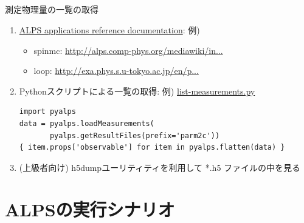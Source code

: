 \subsection*{\redm\whiteb\greenb}
\begin{frame}[t,fragile]{測定物理量の一覧の取得}
  \begin{enumerate}
    \setlength{\itemsep}{1em}
  \item \href{http://alps.comp-phys.org/mediawiki/index.php/ALPS_2_Documentation:Overview}{ALPS applications reference documentation}: 例)
    \begin{itemize}
    \item spinmc: {\footnotesize \href{http://alps.comp-phys.org/mediawiki/index.php/Documentation:ClassicalMCSimulations}{http://alps.comp-phys.org/mediawiki/in...}}
    \item loop: {\footnotesize \href{http://exa.phys.s.u-tokyo.ac.jp/en/projects/alps-looper}{http://exa.phys.s.u-tokyo.ac.jp/en/p...}}
    \end{itemize}
  \item Pythonスクリプトによる一覧の取得: 例) \href{https://gist.github.com/wistaria/71cb8d7a22f45bfe256d}{list-measurements.py}
\begin{lstlisting}
import pyalps
data = pyalps.loadMeasurements(
       pyalps.getResultFiles(prefix='parm2c'))
{ item.props['observable'] for item in pyalps.flatten(data) }
\end{lstlisting}
  \item (上級者向け) h5dumpユーリティティを利用して *.h5 ファイルの中を見る
  \end{enumerate}
\end{frame}

\section{ALPSの実行シナリオ}

